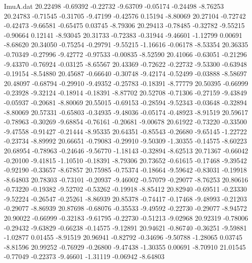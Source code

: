 \begin{filecontents}{ImuA.dat}
  20.22498   -0.69392   -0.22732   -9.63709   -0.05174   -0.24498   -8.76253
  20.24783   -0.71545   -0.31705   -9.47199   -0.42576    0.15194   -8.80069
  20.27104   -0.72742   -0.42473   -9.66581   -0.65475    0.03745   -8.79306
  20.29413   -0.78485   -0.32782   -9.55215   -0.90664    0.12141   -8.93045
  20.31733   -0.72383   -0.31944   -9.46601   -1.12799    0.00691   -8.68620
  20.34050   -0.75254   -0.29791   -9.55215   -1.16616   -0.06178   -8.53354
  20.36335   -0.70349   -0.27996   -9.42772   -0.97533   -0.00835   -8.52590
  20.41066   -0.63051   -0.21296   -9.43370   -0.76924   -0.03125   -8.65567
  20.43369   -0.72622   -0.22732   -9.53300   -0.63948   -0.19154   -8.54880
  20.45687   -0.66640   -0.30748   -9.42174   -0.52499   -0.03888   -8.58697
  20.48097   -0.68794   -0.29910   -9.49352   -0.25783   -0.18391   -8.77779
  20.50395   -0.66999   -0.23928   -9.32124   -0.18914   -0.18391   -8.87702
  20.52708   -0.71306   -0.27159   -9.43849   -0.05937   -0.20681   -8.80069
  20.55015   -0.69153   -0.28594   -9.52343   -0.03648   -0.32894   -8.80069
  20.57331   -0.65803   -0.34935   -9.48036   -0.05174   -0.48923   -8.91519
  20.59617   -0.78963   -0.30269   -9.68854   -0.76161   -0.20681   -9.00678
  20.61922   -0.73220   -0.33500   -9.47558   -0.91427   -0.21444   -8.95335
  20.64351   -0.85543   -0.26680   -9.65145   -1.22722   -0.23734   -8.89992
  20.66651   -0.79083   -0.29910   -9.50309   -1.30355   -0.14575   -8.60223
  20.68954   -0.78963   -0.24646   -9.56770   -1.18143   -0.32894   -8.62513
  20.71367   -0.66042   -0.20100   -9.41815   -1.10510   -0.18391   -8.79306
  20.73652   -0.61615   -0.17468   -9.39542   -0.92190   -0.33657   -8.67857
  20.75985   -0.75374   -0.18664   -9.59642   -0.83031   -0.19918   -8.64803
  20.78303   -0.73101   -0.20937   -9.46002   -0.57079   -0.29077   -8.76253
  20.80616   -0.73220   -0.19382   -9.52702   -0.53262   -0.19918   -8.85412
  20.82940   -0.69511   -0.23330   -9.52224   -0.26547   -0.25261   -8.86939
  20.85378   -0.74417   -0.17468   -9.48993   -0.21203   -0.29077   -8.86939
  20.87698   -0.68076   -0.35533   -9.49592   -0.22730   -0.29077   -8.94572
  20.90022   -0.66999   -0.32183   -9.61795   -0.22730   -0.51213   -9.02968
  20.92319   -0.78006   -0.29432   -9.63829   -0.66238   -0.14575   -9.12891
  20.94621   -0.86740   -0.36251   -9.59881   -1.02877    0.01455   -8.91519
  20.96941   -0.82792   -0.34696   -9.50788   -1.28065    0.03745   -8.81596
  20.99252   -0.76929   -0.26800   -9.47438   -1.30355    0.00691   -8.70910
  21.01545   -0.77049   -0.22373   -9.46601   -1.31119   -0.06942   -8.64803

\end{filecontents}
